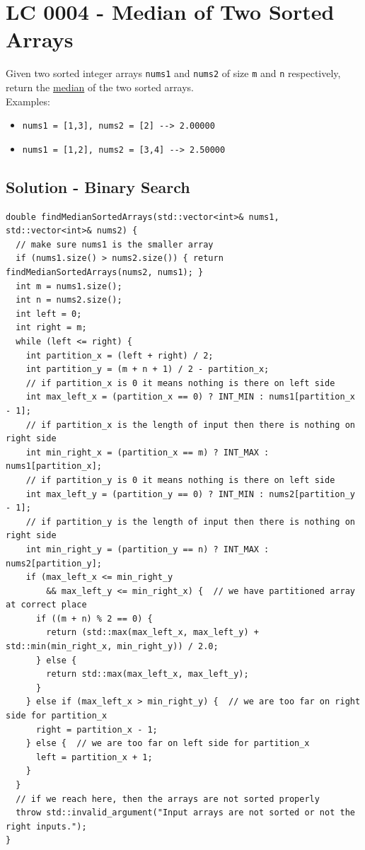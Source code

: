 \section{LC 0004 - Median of Two Sorted Arrays}
Given two sorted integer arrays {\colorbox{CodeBackground}{\lstinline|nums1|}} and {\colorbox{CodeBackground}{\lstinline|nums2|}} of size {\colorbox{CodeBackground}{\lstinline|m|}} and {\colorbox{CodeBackground}{\lstinline|n|}} respectively, return the \ul{median} of the two sorted arrays.\\

Examples:
\begin{itemize}
	\item {\colorbox{CodeBackground}{\lstinline|nums1 = [1,3], nums2 = [2] --> 2.00000|}}
	\item {\colorbox{CodeBackground}{\lstinline|nums1 = [1,2], nums2 = [3,4] --> 2.50000|}}
\end{itemize}

\subsection*{Solution - Binary Search}
\begin{lstlisting}
double findMedianSortedArrays(std::vector<int>& nums1, std::vector<int>& nums2) {
  // make sure nums1 is the smaller array
  if (nums1.size() > nums2.size()) { return findMedianSortedArrays(nums2, nums1); }
  int m = nums1.size();
  int n = nums2.size();
  int left = 0;
  int right = m;
  while (left <= right) {
    int partition_x = (left + right) / 2;
    int partition_y = (m + n + 1) / 2 - partition_x;
    // if partition_x is 0 it means nothing is there on left side
    int max_left_x = (partition_x == 0) ? INT_MIN : nums1[partition_x - 1];
    // if partition_x is the length of input then there is nothing on right side
    int min_right_x = (partition_x == m) ? INT_MAX : nums1[partition_x];
    // if partition_y is 0 it means nothing is there on left side
    int max_left_y = (partition_y == 0) ? INT_MIN : nums2[partition_y - 1];
    // if partition_y is the length of input then there is nothing on right side
    int min_right_y = (partition_y == n) ? INT_MAX : nums2[partition_y];
    if (max_left_x <= min_right_y
        && max_left_y <= min_right_x) {  // we have partitioned array at correct place
      if ((m + n) % 2 == 0) {
        return (std::max(max_left_x, max_left_y) + std::min(min_right_x, min_right_y)) / 2.0;
      } else {
        return std::max(max_left_x, max_left_y);
      }
    } else if (max_left_x > min_right_y) {  // we are too far on right side for partition_x
      right = partition_x - 1;
    } else {  // we are too far on left side for partition_x
      left = partition_x + 1;
    }
  }
  // if we reach here, then the arrays are not sorted properly
  throw std::invalid_argument("Input arrays are not sorted or not the right inputs.");
}

\end{lstlisting}